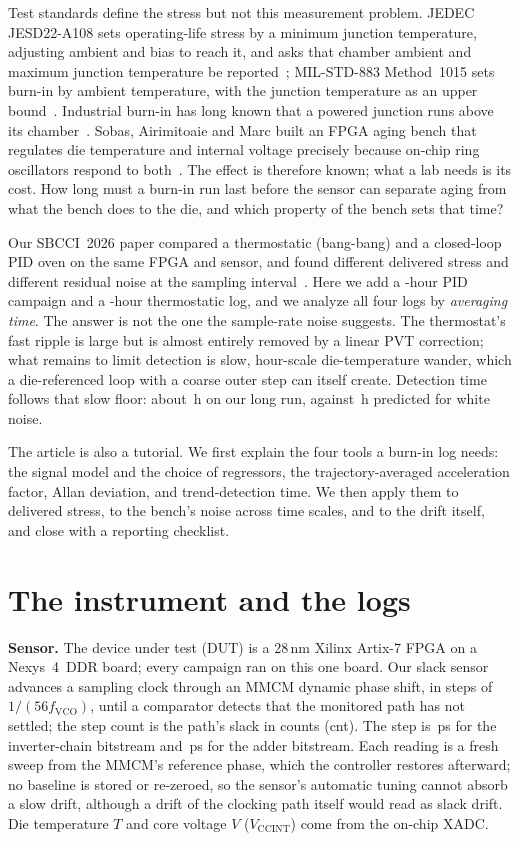 \documentclass[10pt,twocolumn]{article}
\begin{document}
Test standards define the stress but not this measurement problem. JEDEC JESD22-A108 sets operating-life stress by a minimum junction temperature, adjusting ambient and bias to reach it, and asks that chamber ambient and maximum junction temperature be reported~\cite{jedec}; MIL-STD-883 Method~1015 sets burn-in by ambient temperature, with the junction temperature as an upper bound~\cite{mil}. Industrial burn-in has long known that a powered junction runs above its chamber~\cite{vassighi}. Sobas, Airimitoaie and Marc built an FPGA aging bench that regulates die temperature and internal voltage precisely because on-chip ring oscillators respond to both~\cite{sobas}. The effect is therefore known; what a lab needs is its cost. How long must a burn-in run last before the sensor can separate aging from what the bench does to the die, and which property of the bench sets that time?

Our SBCCI~2026 paper compared a thermostatic (bang-bang) and a closed-loop PID oven on the same FPGA and sensor, and found different delivered stress and different residual noise at the sampling interval~\cite{sbcci26}. Here we add a \vDurRCA-hour PID campaign and a \vDurBBlong-hour thermostatic log, and we analyze all four logs by \emph{averaging time}. The answer is not the one the sample-rate noise suggests. The thermostat's fast ripple is large but is almost entirely removed by a linear PVT correction; what remains to limit detection is slow, hour-scale die-temperature wander, which a die-referenced loop with a coarse outer step can itself create. Detection time follows that slow floor: about \vWstar\,h on our long run, against \vTminBound\,h predicted for white noise.

The article is also a tutorial. We first explain the four tools a burn-in log needs: the signal model and the choice of regressors, the trajectory-averaged acceleration factor, Allan deviation, and trend-detection time. We then apply them to delivered stress, to the bench's noise across time scales, and to the drift itself, and close with a reporting checklist.

\section{The instrument and the logs}

\textbf{Sensor.} The device under test (DUT) is a 28\,nm Xilinx Artix-7 FPGA on a Nexys~4~DDR board; every campaign ran on this one board. Our slack sensor~\cite{sbcci25} advances a sampling clock through an MMCM dynamic phase shift, in steps of $1/(56f_{\mathrm{VCO}})$, until a comparator detects that the monitored path has not settled; the step count is the path's slack in counts (cnt). The step is \vPsINV\,ps for the inverter-chain bitstream and \vPsRCA\,ps for the adder bitstream. Each reading is a fresh sweep from the MMCM's reference phase, which the controller restores afterward; no baseline is stored or re-zeroed, so the sensor's automatic tuning cannot absorb a slow drift, although a drift of the clocking path itself would read as slack drift. Die temperature $T$ and core voltage $V$ ($V_{\mathrm{CCINT}}$) come from the on-chip XADC.
\end{document}
